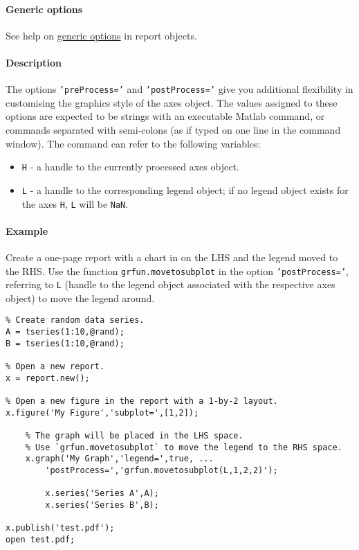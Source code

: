\paragraph{Generic options}

See help on \href{report/Contents}{generic options} in report objects.

\paragraph{Description}

The options \texttt{'preProcess='} and \texttt{'postProcess='} give you
additional flexibility in customising the graphics style of the axes
object. The values assigned to these options are expected to be strings
with an executable Matlab command, or commands separated with
semi-colons (as if typed on one line in the command window). The command
can refer to the following variables:

\begin{itemize}
\itemsep1pt\parskip0pt
\item
  \texttt{H} - a handle to the currently processed axes object.
\item
  \texttt{L} - a handle to the corresponding legend object; if no legend
  object exists for the axes \texttt{H}, \texttt{L} will be
  \texttt{NaN}.
\end{itemize}

\paragraph{Example}

Create a one-page report with a chart in on the LHS and the legend moved
to the RHS. Use the function \texttt{grfun.movetosubplot} in the option
\texttt{'postProcess='}, referring to \texttt{L} (handle to the legend
object associated with the respective axes object) to move the legend
around.

\begin{verbatim}
% Create random data series.
A = tseries(1:10,@rand);
B = tseries(1:10,@rand);

% Open a new report.
x = report.new();

% Open a new figure in the report with a 1-by-2 layout.
x.figure('My Figure','subplot=',[1,2]);

    % The graph will be placed in the LHS space.
    % Use `grfun.movetosubplot` to move the legend to the RHS space.
    x.graph('My Graph','legend=',true, ...
        'postProcess=','grfun.movetosubplot(L,1,2,2)');

        x.series('Series A',A);
        x.series('Series B',B);

x.publish('test.pdf');
open test.pdf;
\end{verbatim}


